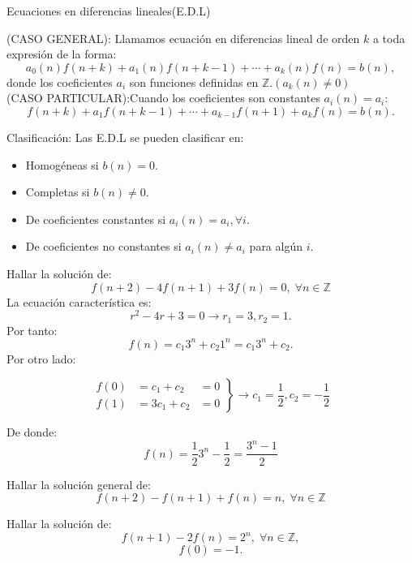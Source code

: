 \documentclass[spanish, utf8,handout]{beamer} %
\theoremstyle{definition}
\begin{document}
\begin{frame}
{Ecuaciones en diferencias lineales(E.D.L)}
\begin{definition}[4]
	 (CASO GENERAL):
	 Llamamos ecuación en diferencias lineal de orden $ k $ a toda expresión de la forma:
	 $$
	  a_{0}(n)f(n+k)+a_{1}(n)f(n+k-1)+\cdots+a_{k}(n)f(n)=b(n),
	 $$
	 donde los coeficientes $ a_{i} $ son funciones definidas en $ \mathbb{Z}.( a_{k}(n)\neq 0)$\\
	 (CASO PARTICULAR):Cuando los coeficientes son constantes $ a_{i}(n)=a_{i} $:
	 $$
	 f(n+k)+a_{1}f(n+k-1)+\cdots+a_{k-1}f(n+1)+a_{k}f(n)=b(n).
	 $$
\end{definition}
Clasificación:
 	Las E.D.L se pueden clasificar en:\\
 	\begin{itemize}
 		\item Homogéneas si $ b(n)=0 .$
 		\item Completas si $ b(n)\neq0.$
 		\item De coeficientes constantes si $ a_{i}(n)=a_{i}, \forall i .$
 		\item De coeficientes no constantes si $ a_{i}(n)\neq a_{i} $ para algún $ i .$
 	\end{itemize}

\end{frame}
\begin{frame}
\begin{example}[Homogénea]
		Hallar la solución de:
		$$
		f(n+2)-4f(n+1)+3f(n)=0, \; \forall n \in \mathbb{Z}
		$$
		La ecuación característica es:
		$$
		r^{2}-4r+3=0 \rightarrow r_{1}=3,r_{2}=1.
		$$
		Por tanto:
		$$
		f(n)=c_{1}3^{n}+c_{2}1^{n}=c_{1}3^{n}+c_{2}.
		$$
		Por otro lado:
				
		\begin{equation*}
		\left.\begin{aligned}
		f(0)&=c_{1}+c_{2}&=0\\
		f(1)&=3c_{1}+c_{2}&=0
		\end{aligned}
		\right\}
		\rightarrow c_{1}=\frac{1}{2}, c_{2}=-\frac{1}{2}
		\end{equation*}
		
		De donde:
		$$
		f(n)=\frac{1}{2}3^{n}-\frac{1}{2}=\frac{3^{n}-1}{2}
		$$
\end{example}
\end{frame}
	\begin{frame}
	\begin{example}[Completa]
		Hallar la solución general de:
		$$
		f(n+2)-f(n+1)+f(n)=n, \; \forall n \in \mathbb{Z}
		$$
	\end{example}
\begin{example}[Completa]
	Hallar la solución de:
	$$
	f(n+1)-2f(n)=2^{n}, \; \forall n \in \mathbb{Z},
	$$
	$$
	f(0)=-1.
	$$
\end{example}
	\end{frame}
\end{document}
